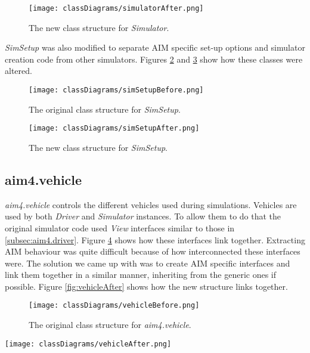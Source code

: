 \begin{appendices}
\begin{figure}[htb]
\centering
\texttt{[image: classDiagrams/simulatorAfter.png]}
\caption{The new class structure for \emph{Simulator}.}
\label{fig:simulatorAfter}
\end{figure}

\emph{SimSetup} was also modified to separate AIM specific set-up options and simulator creation code from other simulators. Figures \ref{fig:simSetupBefore} and \ref{fig:simSetupAfter} show how these classes were altered.

\begin{figure}[htb]
\centering
\texttt{[image: classDiagrams/simSetupBefore.png]}
\caption{The original class structure for \emph{SimSetup}.}
\label{fig:simSetupBefore}
\end{figure}

\begin{figure}[htb]
\centering
\texttt{[image: classDiagrams/simSetupAfter.png]}
\caption{The new class structure for \emph{SimSetup}.}
\label{fig:simSetupAfter}
\end{figure}

\FloatBarrier
\subsection{aim4.vehicle}
\label{subsec:aim4.vehicle}
\emph{aim4.vehicle} controls the different vehicles used during simulations. Vehicles are used by both \emph{Driver} and \emph{Simulator} instances. To allow them to do that the original simulator code used \emph{View} interfaces similar to those in \ref{subsec:aim4.driver}. Figure \ref{fig:vehicleBefore} shows how these interfaces link together. Extracting AIM behaviour was quite difficult because of how interconnected these interfaces were. The solution we came up with was to create AIM specific interfaces and link them together in a similar manner, inheriting from the generic ones if possible. Figure \ref{fig:vehicleAfter} shows how the new structure links together.

\begin{figure}[htb]
\centering
\texttt{[image: classDiagrams/vehicleBefore.png]}
\caption{The original class structure for \emph{aim4.vehicle}.}
\label{fig:vehicleBefore}
\end{figure}

\begin{sidewaysfigure}[p]
\texttt{[image: classDiagrams/vehicleAfter.png]}
\caption{The new class structure for \emph{aim4.vehicle}.}
\label{fig:vehicleAfter}
\end{sidewaysfigure}


\end{appendices}
